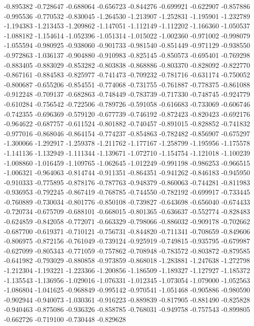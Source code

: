 -0.895382
-0.728647
-0.688064
-0.656723
-0.844276
-0.699921
-0.622907
-0.857886
-0.995536
-0.770532
-0.830045
-1.264530
-1.213907
-1.252831
-1.195901
-1.232789
-1.194383
-1.213453
-1.209862
-1.147051
-1.112149
-1.112202
-1.166360
-1.050537
-1.088182
-1.154614
-1.052396
-1.051314
-1.015022
-1.002360
-0.971002
-0.998079
-1.055594
-0.980925
-0.938060
-0.901733
-0.981540
-0.851449
-0.971129
-0.938550
-0.972863
-1.036137
-0.904880
-0.910983
-0.825145
-0.850573
-0.695401
-0.769298
-0.883405
-0.883029
-0.853282
-0.803838
-0.868886
-0.803370
-0.828092
-0.822770
-0.867161
-0.884583
-0.825977
-0.741473
-0.709232
-0.781716
-0.631174
-0.750052
-0.800687
-0.655206
-0.854551
-0.774068
-0.731755
-0.761887
-0.778375
-0.861088
-0.912248
-0.709137
-0.682863
-0.748449
-0.783739
-0.717330
-0.748745
-0.924779
-0.610284
-0.756542
-0.722506
-0.789726
-0.591058
-0.616683
-0.733069
-0.606746
-0.742355
-0.696369
-0.579120
-0.677739
-0.746192
-0.872423
-0.820423
-0.692176
-0.964622
-0.687757
-0.611524
-0.801882
-0.740457
-0.891015
-0.828852
-0.741832
-0.977016
-0.868046
-0.864154
-0.774237
-0.854863
-0.782482
-0.856907
-0.675297
-1.300066
-1.292917
-1.259378
-1.211762
-1.177167
-1.258799
-1.195956
-1.175578
-1.141136
-1.132949
-1.111344
-1.139671
-1.072710
-1.154754
-1.121018
-1.100239
-1.008860
-1.016459
-1.109765
-1.062645
-1.012249
-0.991198
-0.986253
-0.966515
-1.006321
-0.964063
-0.814744
-0.911351
-0.864351
-0.941262
-0.846183
-0.945950
-0.910333
-0.775895
-0.878176
-0.787763
-0.948379
-0.860063
-0.744281
-0.811983
-0.936953
-0.792245
-0.867419
-0.768785
-0.744550
-0.782192
-0.699917
-0.733445
-0.760889
-0.730034
-0.801776
-0.850108
-0.739827
-0.643698
-0.656040
-0.674433
-0.720734
-0.675709
-0.688101
-0.668015
-0.801365
-0.636637
-0.552774
-0.828483
-0.624859
-0.842058
-0.772071
-0.663329
-0.798066
-0.886032
-0.909178
-0.702662
-0.687700
-0.619371
-0.710121
-0.756731
-0.844820
-0.711341
-0.708659
-0.849606
-0.806975
-0.872156
-0.761049
-0.739124
-0.925919
-0.749815
-0.935795
-0.679987
-0.627099
-0.805343
-0.771059
-0.757862
-0.708948
-0.783572
-0.803872
-0.879585
-0.641982
-0.793029
-0.880858
-0.973859
-0.868018
-1.283881
-1.247638
-1.272798
-1.212304
-1.193221
-1.223366
-1.200856
-1.186509
-1.189327
-1.127927
-1.185372
-1.135543
-1.136956
-1.029016
-1.076331
-1.012345
-1.073054
-1.079000
-1.052563
-1.086804
-1.041625
-0.968849
-0.995142
-0.970541
-1.051468
-0.905886
-0.980590
-0.902944
-0.940073
-1.030361
-0.916223
-0.889839
-0.817905
-0.881490
-0.825828
-0.940463
-0.875086
-0.936326
-0.858785
-0.768031
-0.949758
-0.757543
-0.899805
-0.662726
-0.719100
-0.730448
-0.829628
